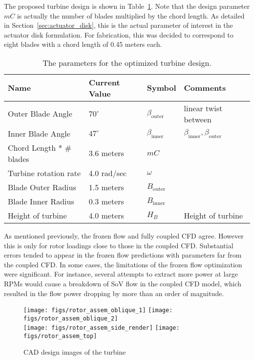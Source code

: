 The proposed turbine design is shown in Table~\ref{tab:turbine}. Note
that the design parameter $mC $ is actually the number of blades
multiplied by the chord length. As detailed in
Section~\ref{sec:actuator_disk}, this is the actual parameter of
interest in the actuator disk formulation. For fabrication, this was 
decided to correspond to eight blades with a chord length of 0.45 meters
each. %

\begin{table}[]
\centering
 \caption{The parameters for the optimized turbine design.}
\begin{tabular}{l|l|l|l}
Name                & Current Value    & Symbol           & Comments \\
 \hline
Outer Blade Angle & $70^{\circ}$ & $\beta_{\text{outer}}$  & linear twist between \\
Inner Blade Angle & $47^{\circ}$ & $\beta_\text{inner}$    & 
	     $\beta_\text{inner},\beta_\text{outer}$ \\ 
Chord Length * \# blades   & 3.6 meters  & $mC $ &  \\
Turbine rotation rate & 4.0 rad/sec  & $\omega$         &  \\
Blade Outer Radius  & 1.5 meters   & $B_\text{outer}$ &  \\
Blade Inner Radius  & 0.3 meters   & $B_\text{inner}$ &  \\
Height of turbine   & 4.0 meters   & $H_B$            & Height of turbine \\
\hline
\end{tabular}
 \label{tab:turbine}
\end{table}

As mentioned previously, the frozen flow and fully coupled CFD
agree. However this is only for rotor loadings close to those in the
coupled CFD. Substantial errors tended to appear in the frozen flow
predictions with parameters far from the coupled CFD. In some cases, the
limitations of the frozen flow optimization were significant. For
instance, several attempts to extract more power at large RPMs would
cause a breakdown of SoV flow in the coupled CFD model, which resulted
in the flow power dropping by more than an order of magnitude. 

  \begin{figure}
   \centering
   \texttt{[image: figs/rotor\_assem\_oblique\_1]}
   \hfill
   \texttt{[image: figs/rotor\_assem\_oblique\_2]}
   \\
   \vspace{1em}
   \texttt{[image: figs/rotor\_assem\_side\_render]}
   \hfill
   \texttt{[image: figs/rotor\_assem\_top]}
   \\   
   \caption{CAD design images of the turbine} 
   \label{fig:cad_turbine}
  \end{figure}


